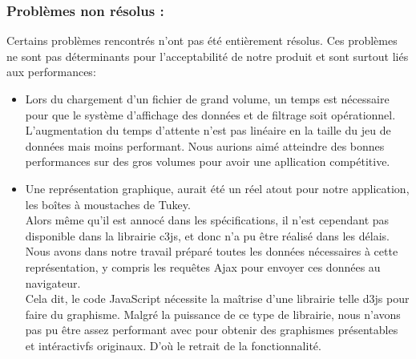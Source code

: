 			\subsubsection*{Problèmes non résolus :}
				Certains problèmes rencontrés n'ont pas été entièrement résolus. Ces problèmes ne sont pas déterminants pour l'acceptabilité de notre produit et sont surtout liés aux performances:
				\begin{itemize}[leftmargin=*]
					\item Lors du chargement d'un fichier de grand volume, un temps est nécessaire pour que le système d'affichage des données et de filtrage soit opérationnel. L'augmentation du temps d'attente n'est pas linéaire en la taille du jeu de données mais moins performant. Nous aurions aimé atteindre des bonnes performances sur des gros volumes pour avoir une apllication compétitive.
					\item Une représentation graphique, aurait été un réel atout pour notre application, les boîtes à moustaches de Tukey.\\
						Alors même qu'il est annocé dans les spécifications, il n'est cependant pas disponible dans la librairie c3js, et donc n'a pu être réalisé dans les délais.\\
						Nous avons dans notre travail préparé toutes les données nécessaires à cette représentation, y compris les requêtes Ajax pour envoyer ces données au navigateur.\\
						Cela dit, le code JavaScript nécessite la maîtrise d'une librairie telle d3js pour faire du graphisme. Malgré la puissance de ce type de librairie, nous n'avons pas pu être assez performant avec pour obtenir des graphismes présentables et intéractivfs originaux. D'où le retrait de la fonctionnalité.
				\end{itemize}
				
		
				
